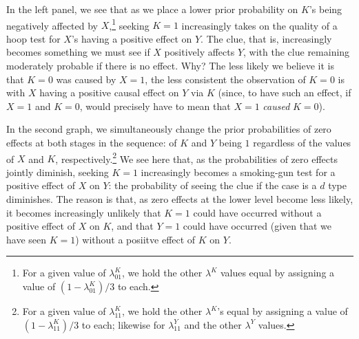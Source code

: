 \documentclass[12pt,]{book}
\let\rmarkdownfootnote\footnote%
\def\footnote{\protect\rmarkdownfootnote}
\begin{document}
In the left panel, we see that as we place a lower prior probability on \(K\)'s being negatively affected by \(X\),\footnote{For a given value of \(\lambda^K_{01}\), we hold the other \(\lambda^K\) values equal by assigning a value of \((1-\lambda^K_{01})/3\) to each.} seeking \(K=1\) increasingly takes on the quality of a hoop test for \(X\)'s having a positive effect on \(Y\). The clue, that is, increasingly becomes something we must see if \(X\) positively affects \(Y\), with the clue remaining moderately probable if there is no effect. Why? The less likely we believe it is that \(K=0\) was caused by \(X=1\), the less consistent the observation of \(K=0\) is with \(X\) having a positive causal effect on \(Y\) via \(K\) (since, to have such an effect, if \(X=1\) and \(K=0\), would precisely have to mean that \(X=1\) \emph{caused} \(K=0\)).

In the second graph, we simultaneously change the prior probabilities of zero effects at both stages in the sequence: of \(K\) and \(Y\) being \(1\) regardless of the values of \(X\) and \(K\), respectively.\footnote{For a given value of \(\lambda^K_{11}\), we hold the other \(\lambda^K\)'s equal by assigning a value of \((1-\lambda^K_{11})/3\) to each; likewise for \(\lambda^Y_{11}\) and the other \(\lambda^Y\) values.} We see here that, as the probabilities of zero effects jointly diminish, seeking \(K=1\) increasingly becomes a smoking-gun test for a positive effect of \(X\) on \(Y\): the probability of seeing the clue if the case is a \(d\) type diminishes. The reason is that, as zero effects at the lower level become less likely, it becomes increasingly unlikely that \(K=1\) could have occurred without a positive effect of \(X\) on \(K\), and that \(Y=1\) could have occurred (given that we have seen \(K=1\)) without a posiitve effect of \(K\) on \(Y\).
\end{document}
